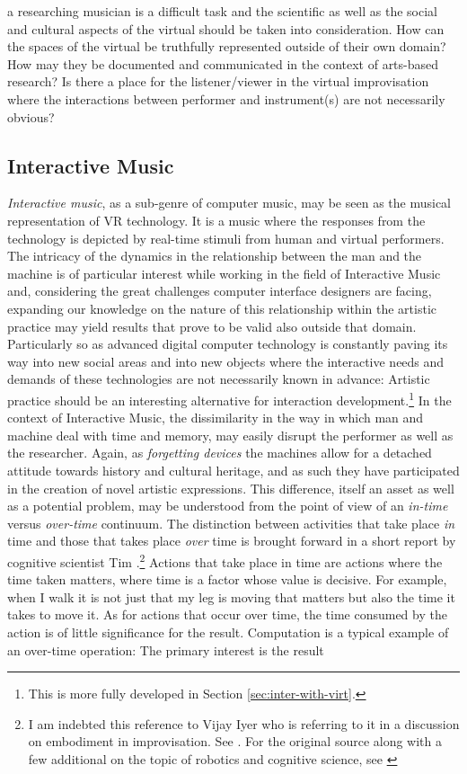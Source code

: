 a researching musician is a difficult task and the scientific as well as the social and cultural aspects of the virtual should be taken into consideration. How can the spaces of the virtual be truthfully represented outside of their own domain? How may they be documented and communicated in the context of arts-based research? Is there a place for the listener/viewer in the virtual improvisation where the interactions between performer and instrument(s) are not necessarily obvious?

\subsection*{Interactive Music}
\label{sec:interactive-music}


\emph{Interactive music}, as a sub-genre of computer music, may be seen as the musical representation of VR technology. It is a music where the responses from the technology is depicted by real-time stimuli from human and virtual performers. The intricacy of the dynamics in the relationship between the man and the machine is of particular interest while working in the field of Interactive Music and, considering the great challenges computer interface designers are facing, expanding our knowledge on the nature of this relationship within the artistic practice may yield results that prove to be valid also outside that domain. Particularly so as advanced digital computer technology is constantly paving its way into new social areas and into new objects where the interactive needs and demands of these technologies are not necessarily known in advance: Artistic practice should be an interesting alternative for interaction development.\footnote{This is more fully developed in Section \ref{sec:inter-with-virt}.} In the context of Interactive Music, the dissimilarity in the way in which man and machine deal with time and memory, may easily disrupt the performer as well as the researcher. Again, as \emph{forgetting devices} the machines allow for a detached attitude towards history and cultural heritage, and as such they have participated in the creation of novel artistic expressions. This difference, itself an asset as well as a potential problem, may be understood from the point of view of an \emph{in-time} versus \emph{over-time} continuum. The distinction between activities that take place \emph{in} time and those that takes place \emph{over} time is brought forward in a short report by cognitive scientist Tim \citeauthor{smithers96}.\footnote{I am indebted this reference to Vijay Iyer who is referring to it in a discussion on embodiment in improvisation. See \parencite{iyer08}. For the original source along with a few additional on the topic of robotics and cognitive science, see \parencite[][]{smithers96,vangelder98,smithers:98}} Actions that take place in time are actions where the time taken matters, where time is a factor whose value is decisive. For example, when I walk it is not just that my leg is moving that matters but also the time it takes to move it. As for actions that occur over time, the time consumed by the action is of little significance for the result. Computation is a typical example of an over-time operation: The primary interest is the result 